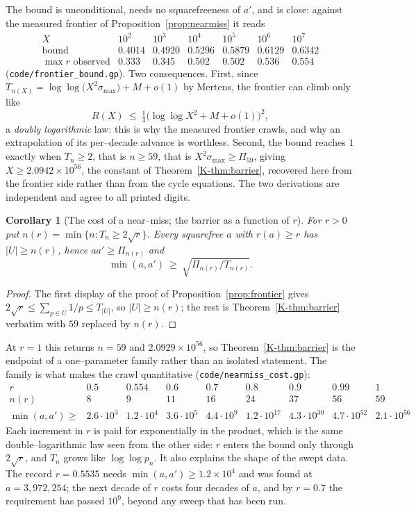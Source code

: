 \documentclass[11pt]{article}
\newtheorem{corollary}[theorem]{Corollary}
\theoremstyle{definition}
\begin{document}
The bound is unconditional, needs no squarefreeness of $a'$, and is close: against the measured
frontier of Proposition~\ref{prop:nearmiss} it reads
\[
\begin{array}{l|cccccc}
X & 10^{2} & 10^{3} & 10^{4} & 10^{5} & 10^{6} & 10^{7}\\\hline
\text{bound} & 0.4014 & 0.4920 & 0.5296 & 0.5879 & 0.6129 & 0.6342\\
\max r \text{ observed} & 0.333 & 0.345 & 0.502 & 0.502 & 0.536 & 0.554
\end{array}
\]
\textup{(\texttt{code/frontier\_bound.gp})}. Two consequences. First, since
$T_{n(X)}=\log\log\bigl(X^{2}\sigma_{\max}\bigr)+M+o(1)$ by Mertens, the frontier can climb only like
\[ R(X)\ \le\ \tfrac14\bigl(\log\log X^{2}+M+o(1)\bigr)^{2}, \]
a \emph{doubly logarithmic} law: this is why the measured frontier crawls, and why an extrapolation
of its per--decade advance is worthless. Second, the bound reaches $1$ exactly when $T_{n}\ge2$, that
is $n\ge59$, that is $X^{2}\sigma_{\max}\ge\Pi_{59}$, giving $X\ge2.0942\times10^{56}$, the
constant of Theorem~\ref{K-thm:barrier}, recovered here from the frontier side rather than from the
cycle equations. The two derivations are independent and agree to all printed digits.

\begin{corollary}[The cost of a near--miss; the barrier as a function of $r$]\label{cor:cost}
For $r>0$ put $n(r)=\min\{n:T_n\ge2\sqrt r\}$. Every squarefree $a$ with $r(a)\ge r$ has
$|U|\ge n(r)$, hence $aa'\ge\Pi_{n(r)}$ and
\[ \min(a,a')\ \ge\ \sqrt{\Pi_{n(r)}/T_{n(r)}}. \]
\end{corollary}
\begin{proof}
The first display of the proof of Proposition~\ref{prop:frontier} gives $2\sqrt r\le\sum_{p\in U}1/p
\le T_{|U|}$, so $|U|\ge n(r)$; the rest is Theorem~\ref{K-thm:barrier} verbatim with $59$ replaced by
$n(r)$.
\end{proof}

At $r=1$ this returns $n=59$ and $2.0929\times10^{56}$, so Theorem~\ref{K-thm:barrier} is the endpoint
of a one--parameter family rather than an isolated statement. The family is what makes the crawl
quantitative \textup{(\texttt{code/nearmiss\_cost.gp})}:
\[
\begin{array}{l|cccccccc}
r & 0.5 & 0.554 & 0.6 & 0.7 & 0.8 & 0.9 & 0.99 & 1\\\hline
n(r) & 8 & 9 & 11 & 16 & 24 & 37 & 56 & 59\\
\min(a,a')\ge & 2.6\!\cdot\!10^{3} & 1.2\!\cdot\!10^{4} & 3.6\!\cdot\!10^{5} & 4.4\!\cdot\!10^{9} &
 1.2\!\cdot\!10^{17} & 4.3\!\cdot\!10^{30} & 4.7\!\cdot\!10^{52} & 2.1\!\cdot\!10^{56}
\end{array}
\]
Each increment in $r$ is paid for exponentially in the product, which is the same double--logarithmic
law seen from the other side: $r$ enters the bound only through $2\sqrt r$, and $T_n$ grows like
$\log\log p_n$. It also explains the shape of the swept data. The record $r=0.5535$ needs
$\min(a,a')\ge1.2\times10^{4}$ and was found at $a=3{,}972{,}254$; the next decade of $r$ costs four
decades of $a$, and by $r=0.7$ the requirement has passed $10^{9}$, beyond any sweep that has been
run.
\end{document}
